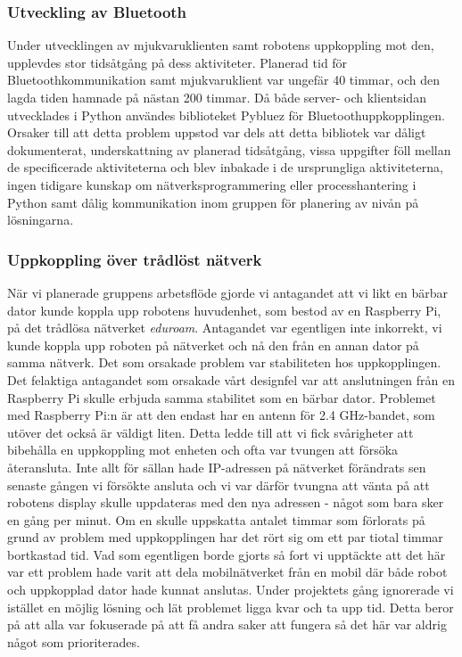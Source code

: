 \documentclass{article}
\begin{document}
\subsubsection{Utveckling av Bluetooth}
Under utvecklingen av mjukvaruklienten samt robotens uppkoppling mot den, upplevdes stor tidsåtgång på dess aktiviteter. Planerad tid för Bluetoothkommunikation samt mjukvaruklient var ungefär 40 timmar, och den lagda tiden hamnade på nästan 200 timmar. 
\newline\newline
Då både server- och klientsidan utvecklades i Python användes biblioteket Pybluez för Bluetoothuppkopplingen. Orsaker till att detta problem uppstod var dels att detta bibliotek var dåligt dokumenterat, underskattning av planerad tidsåtgång, vissa uppgifter föll mellan de specificerade aktiviteterna och blev inbakade i de ursprungliga aktiviteterna, ingen tidigare kunskap om nätverksprogrammering eller processhantering i Python samt dålig kommunikation inom gruppen för planering av nivån på lösningarna. 

\subsubsection{Uppkoppling över trådlöst nätverk}
När vi planerade gruppens arbetsflöde gjorde vi antagandet att vi likt en bärbar dator kunde koppla upp robotens huvudenhet, som bestod av en Raspberry Pi, på det trådlösa nätverket \textit{eduroam}. Antagandet var egentligen inte inkorrekt, vi kunde koppla upp roboten på nätverket och nå den från en annan dator på samma nätverk. Det som orsakade problem var stabiliteten hos uppkopplingen.
\newline\newline
Det felaktiga antagandet som orsakade vårt designfel var att anslutningen från en Raspberry Pi skulle erbjuda samma stabilitet som en bärbar dator. Problemet med Raspberry Pi:n är att den endast har en antenn för 2.4 GHz-bandet, som utöver det också är väldigt liten. Detta ledde till att vi fick svårigheter att bibehålla en uppkoppling mot enheten och ofta var tvungen att försöka återansluta. Inte allt för sällan hade IP-adressen på nätverket förändrats sen senaste gången vi försökte ansluta och vi var därför tvungna att vänta på att robotens display skulle uppdateras med den nya adressen - något som bara sker en gång per minut.
\newline\newline
Om en skulle uppskatta antalet timmar som förlorats på grund av problem med uppkopplingen har det rört sig om ett par tiotal timmar bortkastad tid. Vad som egentligen borde gjorts så fort vi upptäckte att det här var ett problem hade varit att dela mobilnätverket från en mobil där både robot och uppkopplad dator hade kunnat anslutas. Under projektets gång ignorerade vi istället en möjlig lösning och lät problemet ligga kvar och ta upp tid. Detta beror på att alla var fokuserade på att få andra saker att fungera så det här var aldrig något som prioriterades.
\end{document}
